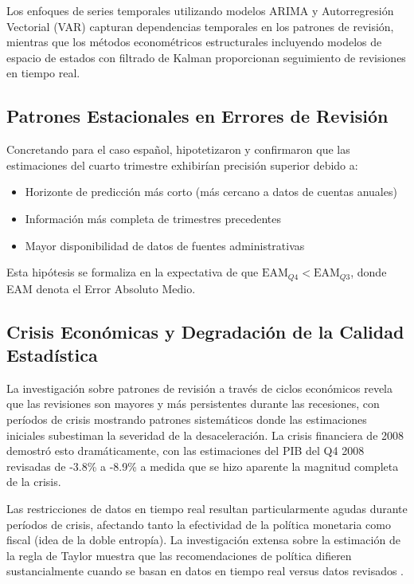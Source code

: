\documentclass{article}
\begin{document}
Los enfoques de series temporales utilizando modelos ARIMA y Autorregresión Vectorial (VAR) capturan dependencias temporales en los patrones de revisión, mientras que los métodos econométricos estructurales incluyendo modelos de espacio de estados con filtrado de Kalman proporcionan seguimiento de revisiones en tiempo real.

\subsection{Patrones Estacionales en Errores de Revisión}

Concretando para el caso español, \citet{pavia2017} hipotetizaron y confirmaron que las estimaciones del cuarto trimestre exhibirían precisión superior debido a:

\begin{itemize}
\item Horizonte de predicción más corto (más cercano a datos de cuentas anuales)
\item Información más completa de trimestres precedentes
\item Mayor disponibilidad de datos de fuentes administrativas
\end{itemize}

Esta hipótesis se formaliza en la expectativa de que $\text{EAM}_{Q4} < \text{EAM}_{Q3}$, donde EAM denota el Error Absoluto Medio.

\subsection{Crisis Económicas y Degradación de la Calidad Estadística}

La investigación sobre patrones de revisión a través de ciclos económicos revela que las revisiones son mayores y más persistentes durante las recesiones, con períodos de crisis mostrando patrones sistemáticos donde las estimaciones iniciales subestiman la severidad de la desaceleración. La crisis financiera de 2008 demostró esto dramáticamente, con las estimaciones del PIB del Q4 2008 revisadas de -3.8\% a -8.9\% a medida que se hizo aparente la magnitud completa de la crisis.

Las restricciones de datos en tiempo real resultan particularmente agudas durante períodos de crisis, afectando tanto la efectividad de la política monetaria como fiscal (idea de la doble entropía). La investigación extensa sobre la estimación de la regla de Taylor muestra que las recomendaciones de política difieren sustancialmente cuando se basan en datos en tiempo real versus datos revisados \citep{orphanides2001}.
\end{document}

